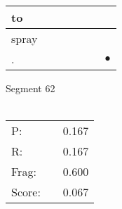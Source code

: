 \documentclass[landscape]{article}
\newcommand{\ssp}{\hspace{2pt}}
\newcommand{\mex}{\cellcolor{g}$\bullet$}
\begin{document}
\begin{tabular}{|l|p{10pt}|p{10pt}|p{10pt}|p{10pt}|p{10pt}|p{10pt}|}
\hline
\ssp to \ssp&\hspace{2pt}&\hspace{2pt}&\hspace{2pt}&\hspace{2pt}&\hspace{2pt}&\hspace{2pt}\\
\hline
\ssp spray \ssp&\hspace{2pt}&\hspace{2pt}&\hspace{2pt}&\hspace{2pt}&\hspace{2pt}&\hspace{2pt}\\
\hline
\ssp \cellcolor{ref5}. \ssp&\hspace{2pt}&\hspace{2pt}&\hspace{2pt}&\hspace{2pt}&\hspace{2pt}&\hspace{2pt}\mex\\
\hline
\end{tabular}

\vspace{6pt}
\noindent Segment 62\\\\
\noindent\begin{tabular}{lm{12pt}r}
\hline
P:&&0.167\\
R:&&0.167\\
Frag:&&0.600\\
Score:&&0.067\\
\end{tabular}

\newpage
\end{document}
